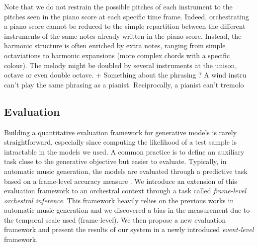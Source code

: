 \documentclass[letterpaper]{article}
\begin{document}

Note that we do not restrain the possible pitches of each instrument to the pitches seen in the piano score at each specific time frame. Indeed, orchestrating a piano score cannot be reduced to the simple repartition between the different instruments of the same notes already written in the piano score. Instead, the harmonic structure is often enriched by extra notes, ranging from simple octaviations to harmonic expansions (more complex chords with a specific colour). The melody might be doubled by several instruments at the unison, octave or even double octave.
+ Something about the phrasing ? A wind instru can't play the same phrasing as a pianist. Reciprocally, a pianist can't tremolo

\subsection{Evaluation}
Building a quantitative evaluation framework for generative models is rarely straightforward, especially since computing the likelihood of a test sample is intractable in the models we used. A common practice is to define an auxiliary task close to the generative objective but easier to evaluate.
Typically, in automatic music generation, the models are evaluated through a predictive task based on a frame-level accuracy measure \cite{DBLP:journals/corr/LiuR14a,boulanger2012modeling,lavrenko2003polyphonic}. We introduce an extension of this evaluation framework to an orchestral context through a task called \textit{frame-level orchestral inference}. This framework heavily relies on the previous works in automatic music generation and we discovered a bias in the measurement due to the temporal scale used (frame-level). We then propose a new evaluation framework and present the results of our system in a newly introduced \textit{event-level} framework.
\end{document}
